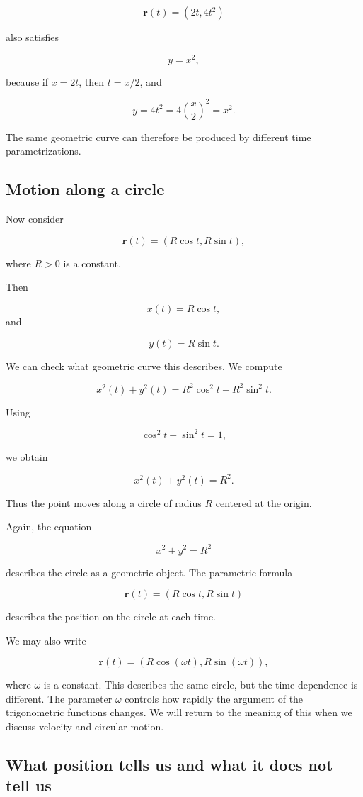 \[
\mathbf{r}(t) = (2t,4t^2)
\]

also satisfies

\[
y=x^2,
\]

because if \(x=2t\), then \(t=x/2\), and

\[
y=4t^2=4\left(\frac{x}{2}\right)^2=x^2.
\]

The same geometric curve can therefore be produced by different time parametrizations.

\subsection{Motion along a circle}

Now consider

\[
\mathbf{r}(t)=(R\cos t,R\sin t),
\]

where \(R>0\) is a constant.

Then

\[
x(t)=R\cos t,
\]
and

\[
y(t)=R\sin t.
\]

We can check what geometric curve this describes. We compute

\[
x^2(t)+y^2(t)
=
R^2\cos^2 t+R^2\sin^2 t.
\]

Using

\[
\cos^2 t+\sin^2 t=1,
\]

we obtain

\[
x^2(t)+y^2(t)=R^2.
\]

Thus the point moves along a circle of radius \(R\) centered at the origin.

Again, the equation

\[
x^2+y^2=R^2
\]

describes the circle as a geometric object. The parametric formula

\[
\mathbf{r}(t)=(R\cos t,R\sin t)
\]

describes the position on the circle at each time.

We may also write

\[
\mathbf{r}(t)=(R\cos(\omega t),R\sin(\omega t)),
\]

where \(\omega\) is a constant. This describes the same circle, but the time dependence is different. The parameter \(\omega\) controls how rapidly the argument of the trigonometric functions changes. We will return to the meaning of this when we discuss velocity and circular motion.

\subsection{What position tells us and what it does not tell us}

